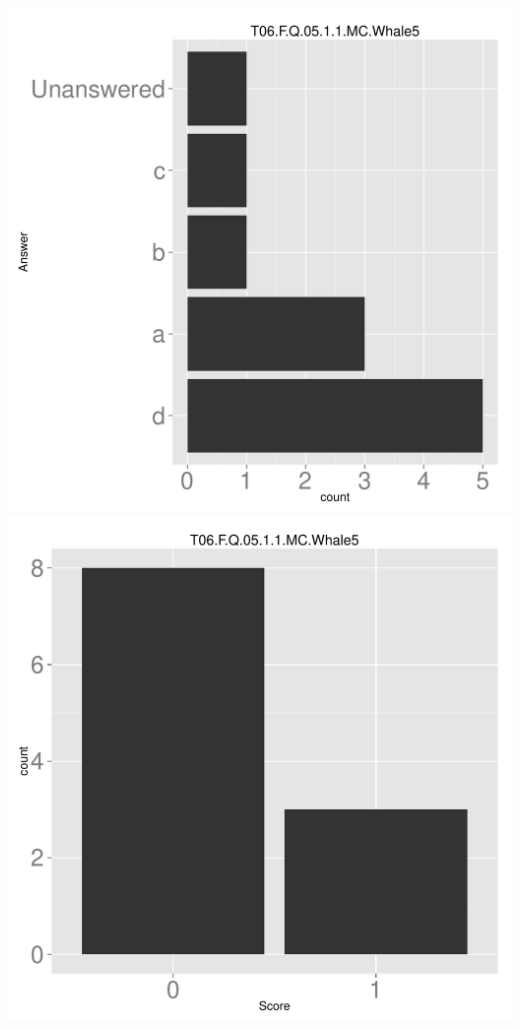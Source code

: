 \documentclass[12pt,nohyper]{tufte-handout}\usepackage[]{graphicx}\usepackage[]{color}
\begin{document}
\begin{center} \includegraphics[width=.45\linewidth]{Topic06_68_answer} \includegraphics[width=.45\linewidth]{Topic06_68_score} \end{center} 
\end{document}
